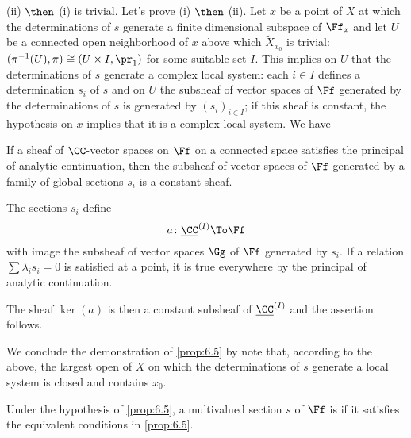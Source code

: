 (ii) $\then$ (i) is trivial.
Let's prove (i) $\then$ (ii).
Let $x$ be a point of $X$ at which the determinations of $s$ generate a finite
dimensional subspace of $\Ff_x$ and let $U$ be a connected open neighborhood of
$x$ above which $\widetilde{X}_{x_0}$ is trivial:
$(\pi^{-1}(U),\pi)\cong(U\times I,\pr_1)$ for some suitable set $I$.
This implies on $U$ that the determinations of $s$ generate a complex local
system: each $i\in I$ defines a determination $s_i$ of $s$ and on $U$ the
subsheaf of vector spaces of $\Ff$ generated by the determinations of $s$ is
generated by $(s_i)_{i\in I}$; if this sheaf is constant, the hypothesis on $x$
implies that it is a complex local system. We have
\begin{lemma}
  If a sheaf of $\CC$-vector spaces on $\Ff$ on a connected space satisfies the
  principal of analytic continuation, then the subsheaf of vector spaces of
  $\Ff$ generated by a family of global sections $s_i$ is a constant sheaf.
\end{lemma}

The sections $s_i$ define
\[
a\colon\underline{\CC}^{(I)}\To\Ff
\]
with image the subsheaf of vector spaces $\Gg$ of $\Ff$ generated by $s_i$.
If a relation $\sum\lambda_is_i=0$ is satisfied at a point, it is true
everywhere by the principal of analytic continuation.

The sheaf $\ker(a)$ is then a constant subsheaf of $\underline{\CC}^{(I)}$ and
the assertion follows.

We conclude the demonstration of \ref{prop:6.5} by note that, according to the
above, the largest open of $X$ on which the determinations of $s$ generate a
local system is closed and contains $x_0$.

\begin{definition}
  Under the hypothesis of \ref{prop:6.5}, a multivalued section $s$ of $\Ff$ is
   if it satisfies the equivalent conditions in
  \ref{prop:6.5}.
\end{definition}

